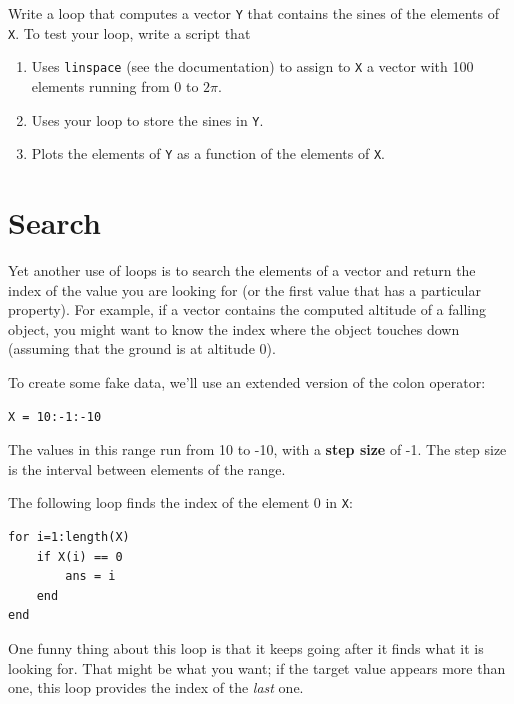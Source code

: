 \documentclass[
]{book}
\begin{document}
\begin{ex}
Write a loop that computes a vector {\tt Y} that
contains the sines of the elements of {\tt X}.  To test your
loop, write a script that

\begin{enumerate}

\item Uses {\tt linspace} (see the documentation) to assign
to {\tt X} a vector with 100 elements running from 0 to $2 \pi$.

\item Uses your loop to store the sines in {\tt Y}.

\item Plots the elements of {\tt Y} as a function of the elements
of {\tt X}.

\end{enumerate}
\end{ex}

\section{Search}
\label{sect:search}

Yet another use of loops is to search the elements of a vector
and return the index of the value you are looking for (or the
first value that has a particular property).  For example, if
a vector contains the computed altitude of a falling object, you
might want to know the index where the object touches down (assuming
that the ground is at altitude 0).

To create some fake data, we'll use an extended version of the
colon operator:

\begin{verbatim}
X = 10:-1:-10
\end{verbatim}

The values in this range run from 10 to -10, with a {\bf step size}
of -1.  The step size is the interval between elements of the range.

The following loop finds the index of the element 0 in {\tt X}:

\begin{verbatim}
for i=1:length(X)
    if X(i) == 0
        ans = i
    end
end
\end{verbatim}

One funny thing about this loop is that it keeps going after it
finds what it is looking for.  That might be what you want; if the
target value appears more than one, this loop provides the index
of the {\em last} one.
\end{document}
